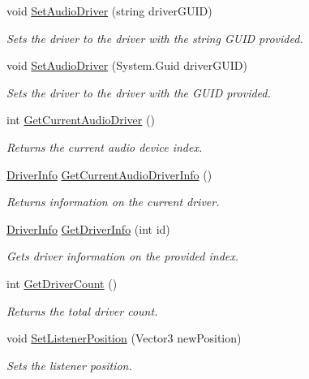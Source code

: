 \begin{DoxyCompactItemize}
void \hyperlink{class_sound_controller_a4b11e23078dd1fb410f3db69f43758ea}{Set\+Audio\+Driver} (string driver\+G\+U\+ID)
\begin{DoxyCompactList}\small\item\em Sets the driver to the driver with the string G\+U\+ID provided. \end{DoxyCompactList}\item 
void \hyperlink{class_sound_controller_a544d8f6cf926ce1ca11ecbab5418b1e1}{Set\+Audio\+Driver} (System.\+Guid driver\+G\+U\+ID)
\begin{DoxyCompactList}\small\item\em Sets the driver to the driver with the G\+U\+ID provided. \end{DoxyCompactList}\item 
int \hyperlink{class_sound_controller_a5722f7a6e1ae91b68d9b01a95ed4aef1}{Get\+Current\+Audio\+Driver} ()
\begin{DoxyCompactList}\small\item\em Returns the current audio device index. \end{DoxyCompactList}\item 
\hyperlink{struct_driver_info}{Driver\+Info} \hyperlink{class_sound_controller_ad41461f18e95fd286970ab750416f908}{Get\+Current\+Audio\+Driver\+Info} ()
\begin{DoxyCompactList}\small\item\em Returns information on the current driver. \end{DoxyCompactList}\item 
\hyperlink{struct_driver_info}{Driver\+Info} \hyperlink{class_sound_controller_a86f6ca86566a727bc20e43427b6c329e}{Get\+Driver\+Info} (int id)
\begin{DoxyCompactList}\small\item\em Gets driver information on the provided index. \end{DoxyCompactList}\item 
int \hyperlink{class_sound_controller_a24de360abb2e93bcf2b220163b1ec2c2}{Get\+Driver\+Count} ()
\begin{DoxyCompactList}\small\item\em Returns the total driver count. \end{DoxyCompactList}\item 
void \hyperlink{class_sound_controller_a8a3c0c2beb23a2908db39d9414aac1e8}{Set\+Listener\+Position} (Vector3 new\+Position)
\begin{DoxyCompactList}\small\item\em Sets the listener position. \end{DoxyCompactList}\item 

\end{DoxyCompactItemize}
